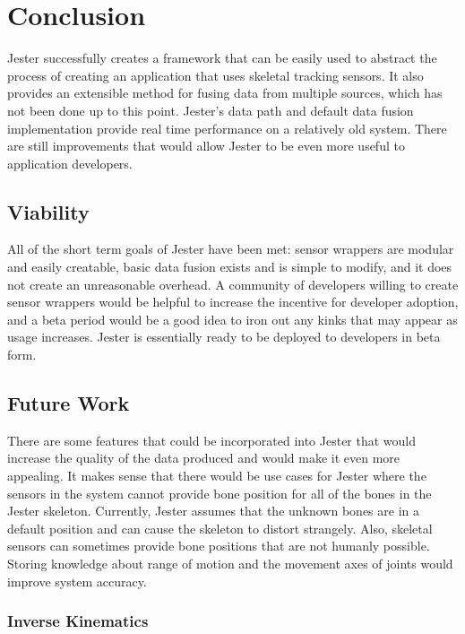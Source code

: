 \chapter{Conclusion}

Jester successfully creates a framework that can be easily used to abstract the process of creating an application that uses skeletal tracking sensors. It also provides an extensible method for fusing data from multiple sources, which has not been done up to this point. Jester's data path and default data fusion implementation provide real time performance on a relatively old system. There are still improvements that would allow Jester to be even more useful to application developers.

\section{Viability}

All of the short term goals of Jester have been met: sensor wrappers are modular and easily creatable, basic data fusion exists and is simple to modify, and it does not create an unreasonable overhead. A community of developers willing to create sensor wrappers would be helpful to increase the incentive for developer adoption, and a beta period would be a good idea to iron out any kinks that may appear as usage increases. Jester is essentially ready to be deployed to developers in beta form.

\section{Future Work}

There are some features that could be incorporated into Jester that would increase the quality of the data produced and would make it even more appealing. It makes sense that there would be use cases for Jester where the sensors in the system cannot provide bone position for all of the bones in the Jester skeleton. Currently, Jester assumes that the unknown bones are in a default position and can cause the skeleton to distort strangely. Also, skeletal sensors can sometimes provide bone positions that are not humanly possible. Storing knowledge about range of motion and the movement axes of joints would improve system accuracy.

\subsection{Inverse Kinematics}

